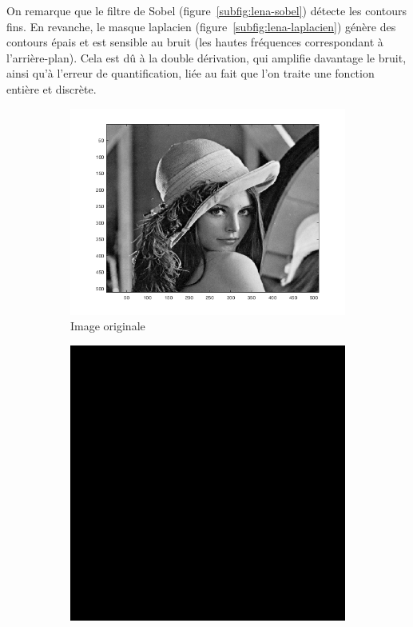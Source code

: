 \documentclass[a4paper]{article}
\newcommand{\figref}[1]{figure~\ref{#1}}
\begin{document}
\begin{enumerate}
On remarque que le filtre de Sobel (\figref{subfig:lena-sobel}) détecte les
        contours fins. En revanche, le masque laplacien
        (\figref{subfig:lena-laplacien}) génère des contours épais et est
        sensible au bruit (les hautes fréquences correspondant à
        l'arrière-plan). Cela est dû à la double dérivation, qui amplifie
        davantage le bruit, ainsi qu'à l'erreur
        de quantification, liée au fait que l'on traite une fonction entière et
        discrète.

\begin{figure}[H]
    \centering
    \begin{subfigure}[c]{0.3\textwidth}
        \centering
        \includegraphics[width=\textwidth]{images/lena.png}
        \caption{Image originale} 
    \label{subfig:lena}
    \end{subfigure}
    \hspace{0.5cm}
    \begin{subfigure}[c]{0.3\textwidth}
        \centering
        \includegraphics[width=\textwidth]{images/lena_sobel.png}

\end{subfigure}
\end{figure}
\end{enumerate}
\end{document}
